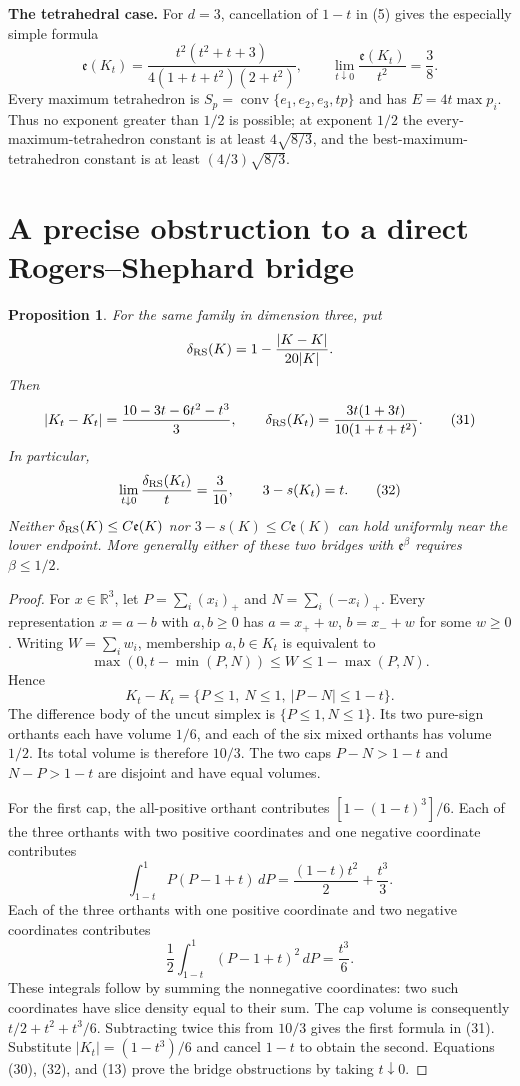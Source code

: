 \documentclass[11pt]{article}
\newtheorem{proposition}[theorem]{Proposition}
\newcommand{\conv}{\operatorname{conv}}
\newcommand{\ee}{\mathfrak e}
\begin{document}
\noindent\textbf{The tetrahedral case.}
For $d=3$, cancellation of $1-t$ in (5) gives the especially simple formula
\[
 \boxed{\ee(K_t)=
 \frac{t^2(t^2+t+3)}{4(1+t+t^2)(2+t^2)},\qquad
 \lim_{t\downarrow0}\frac{\ee(K_t)}{t^2}=\frac38.}
 \tag{30}
\]
Every maximum tetrahedron is $S_p=\conv\{e_1,e_2,e_3,tp\}$ and has
$E=4t\max p_i$. Thus no exponent greater than $1/2$ is possible;
at exponent $1/2$ the every-maximum-tetrahedron constant is at least
$4\sqrt{8/3}$, and the best-maximum-tetrahedron constant is at least
$(4/3)\sqrt{8/3}$.

\section{A precise obstruction to a direct Rogers--Shephard bridge}

\begin{proposition}\label{prop:rs}
For the same family in dimension three, put
\[
 \delta_{\rm RS}(K)=1-\frac{|K-K|}{20|K|}.
\]
Then
\[
 |K_t-K_t|=\frac{10-3t-6t^2-t^3}{3},\qquad
 \delta_{\rm RS}(K_t)=\frac{3t(1+3t)}{10(1+t+t^2)}.
 \tag{31}
\]
In particular,
\[
 \lim_{t\downarrow0}\frac{\delta_{\rm RS}(K_t)}t=\frac3{10},
 \qquad 3-s(K_t)=t.
 \tag{32}
\]
Neither $\delta_{\rm RS}(K)\le C\ee(K)$ nor
$3-s(K)\le C\ee(K)$ can hold uniformly near the lower endpoint.
More generally either of these two bridges with $\ee^\beta$ requires
$\beta\le1/2$.
\end{proposition}

\begin{proof}
For $x\in\mathbb R^3$, let $P=\sum_i(x_i)_+$ and $N=\sum_i(-x_i)_+$.
Every representation $x=a-b$ with $a,b\ge0$ has
$a=x_++w$, $b=x_-+w$ for some $w\ge0$.
Writing $W=\sum_i w_i$, membership $a,b\in K_t$ is equivalent to
\[
 \max(0,t-\min(P,N))\le W\le1-\max(P,N).
\]
Hence
\[
 K_t-K_t=\{P\le1,\ N\le1,\ |P-N|\le1-t\}.
 \tag{33}
\]
The difference body of the uncut simplex is $\{P\le1,N\le1\}$.
Its two pure-sign orthants each have volume $1/6$, and each of the six
mixed orthants has volume $1/2$. Its total volume is therefore $10/3$.
The two caps $P-N>1-t$ and $N-P>1-t$ are disjoint and have equal volumes.

For the first cap, the all-positive orthant contributes
$[1-(1-t)^3]/6$. Each of the three orthants with two positive coordinates
and one negative coordinate contributes
\[
 \int_{1-t}^1 P(P-1+t)\,dP=
 \frac{(1-t)t^2}{2}+\frac{t^3}{3}.
\]
Each of the three orthants with one positive coordinate and two negative
coordinates contributes
\[
 \frac12\int_{1-t}^1(P-1+t)^2\,dP=\frac{t^3}{6}.
\]
These integrals follow by summing the nonnegative coordinates: two such
coordinates have slice density equal to their sum.
The cap volume is consequently $t/2+t^2+t^3/6$. Subtracting twice this
from $10/3$ gives the first formula in (31). Substitute
$|K_t|=(1-t^3)/6$ and cancel $1-t$ to obtain the second.
Equations (30), (32), and (13) prove the bridge obstructions by taking
$t\downarrow0$.
\end{proof}
\end{document}
